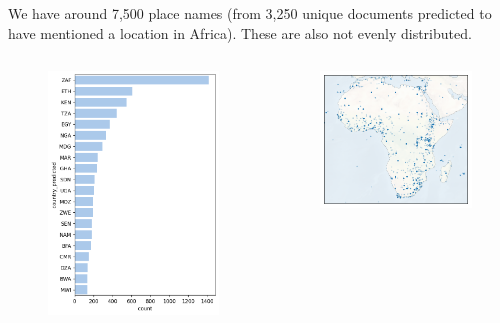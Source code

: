 \documentclass[9pt]{beamer}
\begin{document}
\begin{frame}{We have around 7,500 place names (from 3,250 unique documents predicted to have mentioned a location in Africa). These are also not evenly distributed.}
\begin{columns}
	\begin{column}{0.5\linewidth}
		\begin{figure}
			\includegraphics[width=0.8\linewidth]{../plots/literature_distribution/by_country_africa.png}
		\end{figure}
	\end{column}
	\begin{column}{0.5\linewidth}
		\begin{figure}
			\includegraphics[width=\linewidth]{../plots/maps/predicted_places_africa.png}

\end{figure}
\end{column}
\end{columns}
\end{frame}
\end{document}
